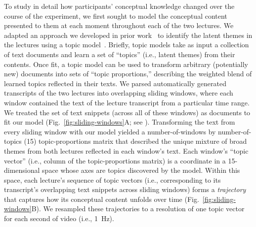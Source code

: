 \documentclass[10pt]{article}
\renewcommand{\nameref}[1]{\mbox{\textit{\oldnameref{#1}}}}
\begin{document}
To study in detail how participants' conceptual knowledge changed over the
course of the experiment, we first sought to model the conceptual content
presented to them at each moment throughout each of the two lectures. We
adapted an approach we developed in prior work~\citep{HeusEtal21} to identify
the latent themes in the lectures using a topic model~\citep{BleiEtal03}.
Briefly, topic models take as input a collection of text documents and learn a
set of ``topics'' (i.e., latent themes) from their contents. Once fit, a topic
model can be used to transform arbitrary (potentially new) documents into sets
of ``topic proportions,'' describing the weighted blend of learned topics
reflected in their texts. We parsed automatically generated transcripts of the
two lectures into overlapping sliding windows, where each window contained the
text of the lecture transcript from a particular time range. We treated the set
of text snippets (across all of these windows) as documents to fit our model
(Fig.~\ref{fig:sliding-windows}A; see \nameref{subsec:topic-modeling}).
Transforming the text from every sliding window with our model yielded a
number-of-windows by number-of-topics (15) topic-proportions matrix that
described the unique mixture of broad themes from both lectures reflected in
each window's text. Each window's ``topic vector'' (i.e., column of the
topic-proportions matrix) is a coordinate in a 15-dimensional space whose axes
are topics discovered by the model. Within this space, each lecture's sequence
of topic vectors (i.e., corresponding to its transcript's overlapping text
snippets across sliding windows) forms a \textit{trajectory} that captures how
its conceptual content unfolds over time (Fig.~\ref{fig:sliding-windows}B). We
resampled these trajectories to a resolution of one topic vector for each
second of video (i.e., 1~Hz).
\end{document}
